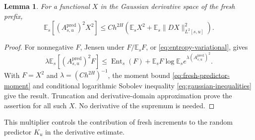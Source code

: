 \documentclass[11pt,a4paper]{amsart}
\theoremstyle{plain}
\newtheorem{lemma}[theorem]{Lemma}
\theoremstyle{definition}
\theoremstyle{remark}
\newcommand{\EE}{\mathbb{E}}
\newcommand{\Es}{\EE_s}
\newcommand{\Ent}{\operatorname{Ent}}
\newcommand{\pred}{\mathrm{pred}}
\begin{document}
\begin{lemma}\label{lem:multiplier}
For a functional $X$ in the Gaussian derivative space of the fresh prefix,
\begin{equation}\label{eq:multiplier}
 \Es[(A_{s,u}^{\pred})^2X^2]
 \le C h^{2H}\left(\Es X^2+\Es\|DX\|_{L^2[s,u]}^2\right).
\end{equation}
\end{lemma}
\begin{proof}
For nonnegative $F$, Jensen under $F/\Es F$, or \eqref{eq:entropy-variational}, gives
\[
 \lambda\Es[(A_{s,u}^{\pred})^2F]
 \le\Ent_s(F)+\Es F\log\Es e^{\lambda(A_{s,u}^{\pred})^2}.
\]
With $F=X^2$ and $\lambda=(Ch^{2H})^{-1}$, the moment bound \eqref{eq:fresh-predictor-moment} and conditional logarithmic Sobolev inequality \eqref{eq:gaussian-inequalities} give the result. Truncation and derivative-domain approximation prove the assertion for all such $X$. No derivative of the supremum is needed.
\end{proof}
This multiplier controls the contribution of fresh increments to the random predictor $K_u$ in the derivative estimate.
\end{document}
